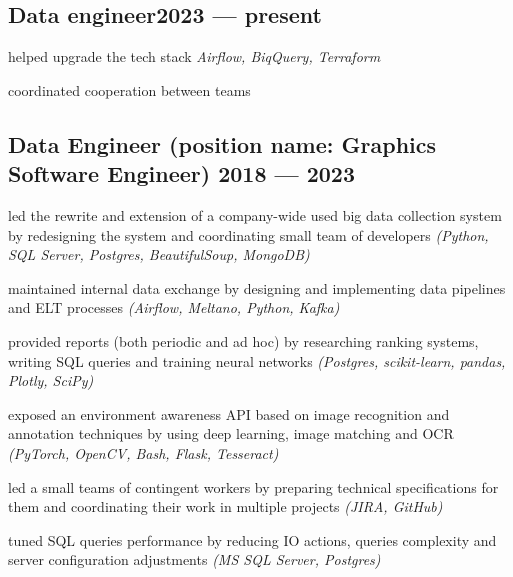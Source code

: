 \documentclass[letter,10pt]{article}
\begin{document}
\subsection{{Data engineer\hfill 2023 --- present}}
\begin{zitemize}
\item helped upgrade the tech stack \emph{Airflow, BiqQuery, Terraform}
\item coordinated cooperation between teams
\end{zitemize}

\subsection{{Data Engineer (position name: Graphics Software Engineer) \hfill 2018 --- 2023}}
\begin{zitemize}
\item led the rewrite and extension of a company-wide used big data collection system by redesigning the system and coordinating small team of developers \emph{(Python, SQL Server, Postgres, BeautifulSoup, MongoDB)}
\item maintained internal data exchange by designing and implementing data pipelines and ELT processes \emph{(Airflow, Meltano, Python, Kafka)}
\item provided reports (both periodic and ad hoc) by researching ranking systems, writing SQL queries and training neural networks \emph{(Postgres, scikit-learn,  pandas, Plotly, SciPy)}
\item exposed an environment awareness API based on image recognition and annotation techniques by using deep learning, image matching and OCR \emph{(PyTorch, OpenCV, Bash, Flask, Tesseract)}
\item led a small teams of contingent workers by preparing technical specifications for them and coordinating their work in multiple projects \emph{(JIRA, GitHub)}
\item tuned SQL queries performance by reducing IO actions, queries complexity and server configuration adjustments \emph{(MS SQL Server, Postgres)}
\end{zitemize}
\end{document}
